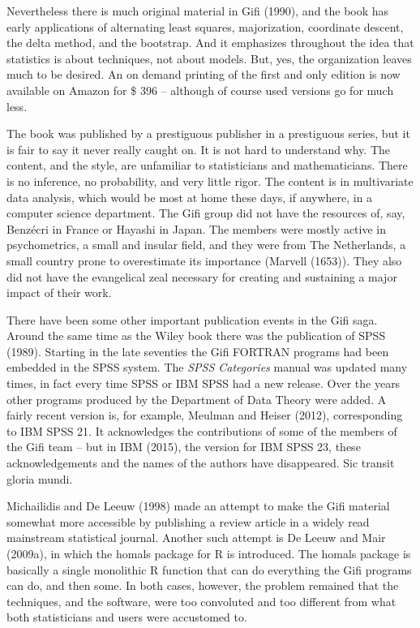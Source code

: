 \documentclass[
  12pt,
  letterpaper,
  DIV=11,
  numbers=noendperiod]{scrreprt}
\begin{document}
Nevertheless there is much original material in Gifi (1990), and the
book has early applications of alternating least squares, majorization,
coordinate descent, the delta method, and the bootstrap. And it
emphasizes throughout the idea that statistics is about techniques, not
about models. But, yes, the organization leaves much to be desired. An
on demand printing of the first and only edition is now available on
Amazon for \$ 396 -- although of course used versions go for much less.

The book was published by a prestiguous publisher in a prestiguous
series, but it is fair to say it never really caught on. It is not hard
to understand why. The content, and the style, are unfamiliar to
statisticians and mathematicians. There is no inference, no probability,
and very little rigor. The content is in multivariate data analysis,
which would be most at home these days, if anywhere, in a computer
science department. The Gifi group did not have the resources of, say,
Benzécri in France or Hayashi in Japan. The members were mostly active
in psychometrics, a small and insular field, and they were from The
Netherlands, a small country prone to overestimate its importance
(Marvell (1653)). They also did not have the evangelical zeal necessary
for creating and sustaining a major impact of their work.

There have been some other important publication events in the Gifi
saga. Around the same time as the Wiley book there was the publication
of SPSS (1989). Starting in the late seventies the Gifi FORTRAN programs
had been embedded in the SPSS system. The \emph{SPSS Categories} manual
was updated many times, in fact every time SPSS or IBM SPSS had a new
release. Over the years other programs produced by the Department of
Data Theory were added. A fairly recent version is, for example, Meulman
and Heiser (2012), corresponding to IBM SPSS 21. It acknowledges the
contributions of some of the members of the Gifi team -- but in IBM
(2015), the version for IBM SPSS 23, these acknowledgements and the
names of the authors have disappeared. Sic transit gloria mundi.

Michailidis and De Leeuw (1998) made an attempt to make the Gifi
material somewhat more accessible by publishing a review article in a
widely read mainstream statistical journal. Another such attempt is De
Leeuw and Mair (2009a), in which the homals package for R is introduced.
The homals package is basically a single monolithic R function that can
do everything the Gifi programs can do, and then some. In both cases,
however, the problem remained that the techniques, and the software,
were too convoluted and too different from what both statisticians and
users were accustomed to.
\end{document}
